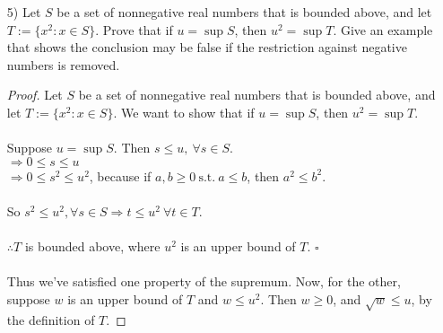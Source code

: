 \documentclass[12pt,letterpaper]{article}
\theoremstyle{case}
\begin{document}
\begin{enumerate}
\begin{enumerate}
\begin{proof}
\begin{align*}
				\because \inf S &\leq s,\ \forall s \in S,
					\\ \Rightarrow a\inf S &\leq aS,\ \forall as \in aS
				\end{align*}
				For any $\epsilon > 0, \frac{\epsilon}{s} > 0$. Then we have that $\exists s_0 \in S\ \text{s.t.}\ s_0 \leq \inf S + \frac{\epsilon}{a} \Rightarrow as_0 \leq a\inf S + \epsilon$, where $as_0 \in aS$.
				\\\\$\therefore \inf (aS) = a\inf S$. $\square$
				\\\\Now, we want to show that $\sup (aS) = a\sup S$. By the definition of the supremum, we have that $s \leq \sup S,\ \forall s \in S \Rightarrow as \leq a\sup S,\ \forall as \in aS$. So for any $\epsilon > 0, \frac{\epsilon}{a} > 0$, we have that $\exists s' \in S\ \text{s.t.}\ s' = \sup S - \frac{\epsilon}{a}$.
				\\\\$\therefore \sup (aS) = a\sup S$.
			\end{proof}
			\item[5)] Let $S$ be a set of nonnegative real numbers that is bounded above, and let $T := \{x^2: x \in S\}$. Prove that if $u = \sup S$, then $u^2 = \sup T$. Give an example that shows the conclusion may be false if the restriction against negative numbers is removed.
			\begin{proof}
				Let $S$ be a set of nonnegative real numbers that is bounded above, and let $T:=\{x^2:x \in S\}$. We want to show that if $u = \sup S$, then $u^2 = \sup T$.
				\\\\Suppose $u = \sup S$. Then $s \leq u,\ \forall s \in S$.
				\\$\Rightarrow 0 \leq s \leq u$
				\\$\Rightarrow 0 \leq s^2 \leq u^2$, because if $a,b \geq 0\ \text{s.t.}\ a \leq b$, then $a^2 \leq b^2$.
				\\\\So $s^2 \leq u^2, \forall s \in S \Rightarrow t \leq u^2 \ \forall t \in T$.
				\\\\$\therefore T$ is bounded above, where $u^2$ is an upper bound of $T$. $\square$
				\\\\Thus we've satisfied one property of the supremum. Now, for the other, suppose $w$ is an upper bound of $T$ and $w \leq u^2$. Then $w \geq 0$, and $\sqrt{w} \leq u$, by the definition of $T$.

\end{proof}
\end{enumerate}
\end{enumerate}
\end{document}
